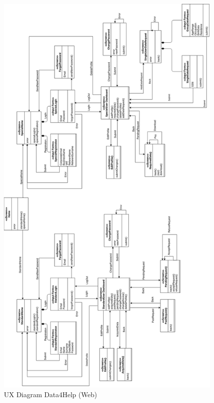 \begin{figure}[H]
  \begin{center}
  	\includegraphics[height=0.68\paperheight]{./img/UXDiagram/UX_Diagram_Data4Help.png}
    \hspace{0.05\linewidth}
    \centering
    \caption{UX Diagram Data4Help (Web)}
		\label{img:Data4Help}
    \end{center}
\end{figure}

